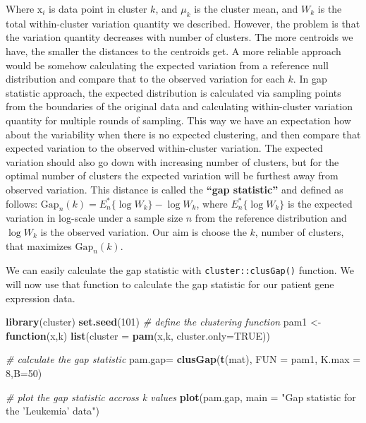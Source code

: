 \documentclass[12pt,]{krantz}
\newenvironment{Shaded}{\begin{snugshade}}{\end{snugshade}}
\newcommand{\CommentTok}[1]{\textcolor[rgb]{0.56,0.35,0.01}{\textit{#1}}}
\newcommand{\ControlFlowTok}[1]{\textcolor[rgb]{0.13,0.29,0.53}{\textbf{#1}}}
\newcommand{\DataTypeTok}[1]{\textcolor[rgb]{0.13,0.29,0.53}{#1}}
\newcommand{\DecValTok}[1]{\textcolor[rgb]{0.00,0.00,0.81}{#1}}
\newcommand{\KeywordTok}[1]{\textcolor[rgb]{0.13,0.29,0.53}{\textbf{#1}}}
\newcommand{\NormalTok}[1]{#1}
\newcommand{\OtherTok}[1]{\textcolor[rgb]{0.56,0.35,0.01}{#1}}
\newcommand{\StringTok}[1]{\textcolor[rgb]{0.31,0.60,0.02}{#1}}
\begin{document}
Where \(\mathrm{x}_i\) is data point in cluster \(k\), and \(\mu_k\) is the cluster mean, and \(W_k\) is the total within-cluster variation quantity we described. However, the problem is that the variation quantity decreases with number of clusters. The more centroids we have, the smaller the distances to the centroids get. A more reliable approach would be somehow calculating the expected variation from a reference null distribution and compare that to the observed variation for each \(k\). In gap statistic approach, the expected distribution is calculated via sampling points from the boundaries of the original data and calculating within-cluster variation quantity for multiple rounds of sampling. This way we have an expectation how about the variability when there is no expected clustering, and then compare that expected variation to the observed within-cluster variation. The expected variation should also go down with increasing number of clusters, but for the optimal number of clusters the expected variation will be furthest away from observed variation. This distance is called the \textbf{``gap statistic''} and defined as follows:
\(\displaystyle \mathrm{Gap}_n(k) = E_n^*\{\log W_k\} - \log W_k\), where \(E_n^*\{\log W_k\}\) is the expected variation in log-scale under a sample size \(n\) from the reference distribution and \(\log W_k\) is the observed variation. Our aim is choose the \(k\), number of clusters, that maximizes \(\mathrm{Gap}_n(k)\).

We can easily calculate the gap statistic with \texttt{cluster::clusGap()} function. We will now use that function to calculate the gap statistic for our patient gene expression data.

\begin{Shaded}
\begin{Highlighting}[]
\KeywordTok{library}\NormalTok{(cluster)}
\KeywordTok{set.seed}\NormalTok{(}\DecValTok{101}\NormalTok{)}
\CommentTok{# define the clustering function}
\NormalTok{pam1 <-}\StringTok{ }\ControlFlowTok{function}\NormalTok{(x,k) }
  \KeywordTok{list}\NormalTok{(}\DataTypeTok{cluster =} \KeywordTok{pam}\NormalTok{(x,k, }\DataTypeTok{cluster.only=}\OtherTok{TRUE}\NormalTok{))}

\CommentTok{# calculate the gap statistic}
\NormalTok{pam.gap=}\StringTok{ }\KeywordTok{clusGap}\NormalTok{(}\KeywordTok{t}\NormalTok{(mat), }\DataTypeTok{FUN =}\NormalTok{ pam1, }\DataTypeTok{K.max =} \DecValTok{8}\NormalTok{,}\DataTypeTok{B=}\DecValTok{50}\NormalTok{)}

\CommentTok{# plot the gap statistic accross k values}
\KeywordTok{plot}\NormalTok{(pam.gap, }\DataTypeTok{main =} \StringTok{"Gap statistic for the 'Leukemia' data"}\NormalTok{)}
\end{Highlighting}
\end{Shaded}
\end{document}
